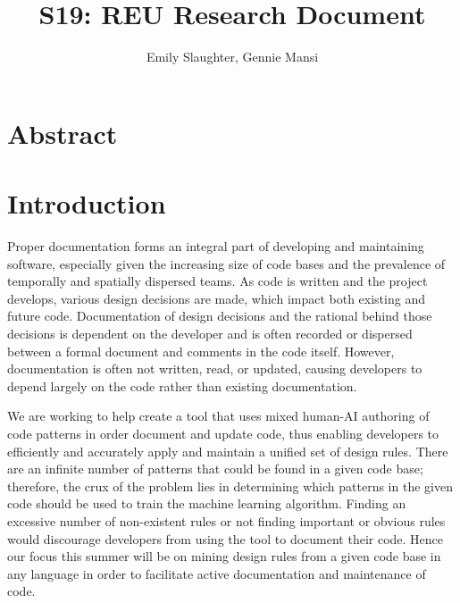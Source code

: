 \documentclass[12pt]{article}
\title{S19: REU Research Document}
\author{Emily Slaughter, Gennie Mansi }
\begin{document}
\maketitle

\clearpage

\tableofcontents

\clearpage

\section{Abstract}



\clearpage
\section{Introduction}

Proper documentation forms an integral part of developing and maintaining software, especially given the increasing size of code bases and the prevalence of temporally and spatially dispersed teams. As code is written and the project develops, various design decisions are made, which impact both existing and future code. Documentation of design decisions and the rational behind those decisions is dependent on the developer and is often recorded or dispersed between a formal document and comments in the code itself. However, documentation is often not written, read, or updated, causing developers to depend largely on the code rather than existing documentation. 

We are working to help create a tool that uses mixed human-AI authoring of code patterns in order document and update code, thus enabling developers to efficiently and accurately apply and maintain a unified set of design rules. There are an infinite number of patterns that could be found in a given code base; therefore, the crux of the problem lies in determining which patterns in the given code should be used to train the machine learning algorithm. Finding an excessive number of non-existent rules or not finding important or obvious rules would discourage developers from using the tool to document their code. Hence our focus this summer will be on mining design rules from a given code base in any language in order to facilitate active documentation and maintenance of code.
\end{document}
